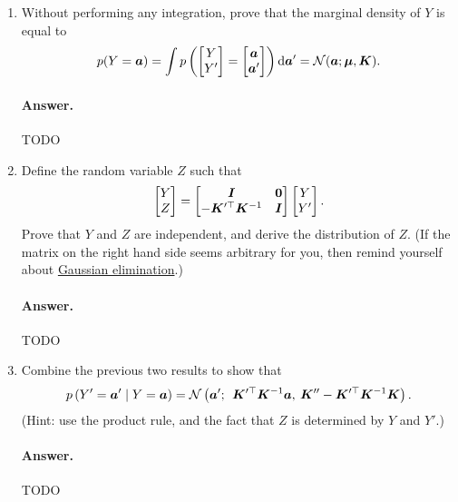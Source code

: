 \documentclass[11pt,letterpaper]{article}
\newenvironment{answer}{%
    \vspace{1em}
    \color{black}
    \paragraph{Answer.}
  }{%
    \vspace{1em}
  }
\begin{document}
\begin{enumerate}
  \item Without performing any integration, prove that the marginal density of $Y$ is equal to
  \begin{equation}
    p(Y = {\bm{a}})
    = \int p\left( \begin{bmatrix} Y \\ Y' \end{bmatrix} = \begin{bmatrix} {\bm{a}} \\ {\bm{a}}' \end{bmatrix} \right) \textrm{d} {\bm{a}}'
    = \mathcal{N}({\bm{a}}; {\bm{\mu}}, {\bm{K}}).
    \label{eqn:marginalization}
  \end{equation}

\begin{answer}
  TODO
\end{answer}

  \item Define the random variable $Z$ such that
    $$
      \begin{bmatrix}
        Y \\ Z
      \end{bmatrix}
      =
      \begin{bmatrix}
        {\bm{I}} & {\bm{0}} \\
        -{\bm{K}}^{\prime\top}{\bm{K}}^{-1} & {\bm{I}}
      \end{bmatrix}
      \begin{bmatrix} Y \\ Y' \end{bmatrix}.
    $$
    Prove that $Y$ and $Z$ are independent, and derive the distribution of $Z$.
    (If the matrix on the right hand side seems arbitrary for you, then remind yourself about \href{https://en.wikipedia.org/wiki/Gaussian_elimination}{Gaussian elimination}.)

\begin{answer}
  TODO
\end{answer}

  \item Combine the previous two results to show that
    \begin{equation}
      p\left( Y' = {\bm{a}}' \mid Y = {\bm{a}} \right) = \mathcal{N} \left(
        {\bm{a}}'; \:\: {\bm{K}}^{\prime\top} {\bm{K}}^{-1} {\bm{a}}, \: {\bm{K}}^{\prime\prime} - {\bm{K}}^{\prime\top} {\bm{K}}^{-1} {\bm{K}}
      \right).
      \label{eqn:conditioning}
    \end{equation}
    (Hint: use the product rule, and the fact that $Z$ is determined by $Y$ and $Y'$.)

\begin{answer}
  TODO
\end{answer}

\end{enumerate}
\end{document}
